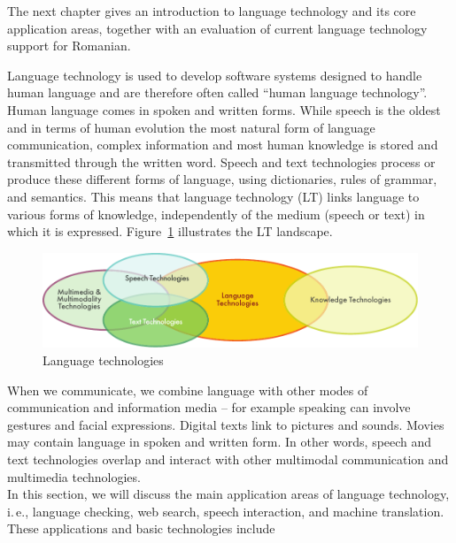\begin{multicols}{2}
The next chapter gives an introduction to language technology and its core application areas, together with an evaluation of current language technology support for Romanian.

\end{multicols}

\clearpage


\begin{multicols}{2}

Language technology is used to develop software systems designed to handle human language and are therefore often called ``human language technology''. Human language comes in spoken and written forms. While speech is the oldest and in terms of human evolution the most natural form of language communication, complex information and most human knowledge is stored and transmitted through the written word. Speech and text technologies process or produce these different forms of language, using dictionaries, rules of grammar, and semantics. This means that language technology (LT) links language to various forms of knowledge, independently of the medium (speech or text) in which it is expressed. Figure~\ref{fig:ltincontext_en} illustrates the LT landscape.

\begin{figure}[htb]
  \center
  \includegraphics[width=\textwidth]{../_media/english/language_technologies}
  \caption{Language technologies}
  \label{fig:ltincontext_en}
\end{figure}

When we communicate, we combine language with other modes of communication and information media – for example speaking can involve gestures and facial expressions. Digital texts link to pictures and sounds. Movies may contain language in spoken and written form. In other words, speech and text technologies overlap and interact with other multimodal communication and multimedia technologies.\\ 
In this section, we will discuss the main application areas of language technology, i.\,e., language checking, web search, speech interaction, and machine translation. These applications and basic technologies include 


\end{multicols}
